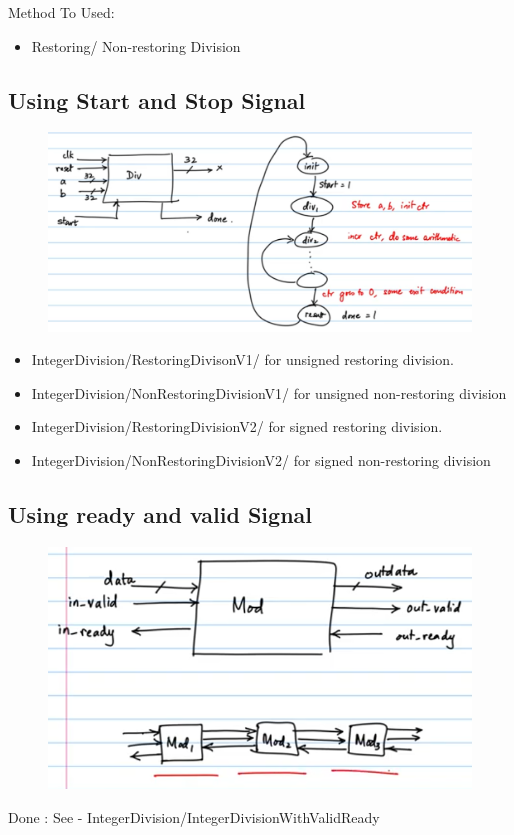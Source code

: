 \documentclass{article}
\begin{document}
Method To Used:
\begin{itemize}
    \item Restoring/ Non-restoring Division
\end{itemize}


\subsection{Using Start and Stop Signal}
\begin{figure}[H]
    \centering
    \includegraphics[scale=0.3]{Resources/Images/Assignment2_IM1.png}
\end{figure}

\begin{itemize}
    \item IntegerDivision/RestoringDivisonV1/ for unsigned restoring division.
    \item IntegerDivision/NonRestoringDivisionV1/ for unsigned non-restoring division
    \item IntegerDivision/RestoringDivisionV2/ for signed restoring division.
    \item IntegerDivision/NonRestoringDivisionV2/ for signed non-restoring division
\end{itemize}

\subsection{Using ready and valid Signal}
\begin{figure}[H]
    \centering
    \includegraphics[scale=0.3]{Resources/Images/Assignment2_IM2.png}
\end{figure}
Done : See - IntegerDivision/IntegerDivisionWithValidReady
\end{document}
